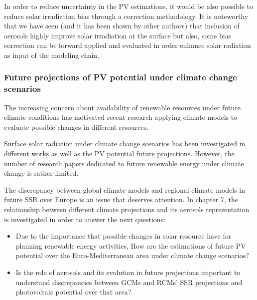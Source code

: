In order to reduce uncertainty in the PV estimations, it would be also possible to reduce solar irradiation bias through a correction methodology. It is noteworthy that we have seen (and it has been shown by other authors) that inclusion of aerosols highly improve solar irradiation at the surface but also, some bias correction can be forward applied and evaluated in order enhance solar radiation as input of the modeling chain.  



\subsubsection{Future projections of PV potential under climate change scenarios}

The increasing concern about availability of renewable resources under future climate conditions has motivated recent research applying climate models to evaluate possible changes in different resources. 

Surface solar radiation under climate change scenarios has been investigated in different works as well as the PV potential future projections. However, the number of research papers dedicated to future renewable energy under climate change is rather limited.

The discrepancy between global climate models and regional climate models in future SSR over Europe is an issue that deserves attention. In chapter 7, the relationship between different climate projections and its aerosols representation is investigated in order to answer the next questions:

\begin{itemize}
\item Due to the importance that possible changes in solar resource have for planning renewable energy activities, How are the estimations of future PV potential over the Euro-Mediterranean area under climate change scenarios?
\item Is the role of aerosols and its evolution in future projections important to understand discrepancies between GCMs and RCMs' SSR projections and photovoltaic potential over that area?

\end{itemize}

